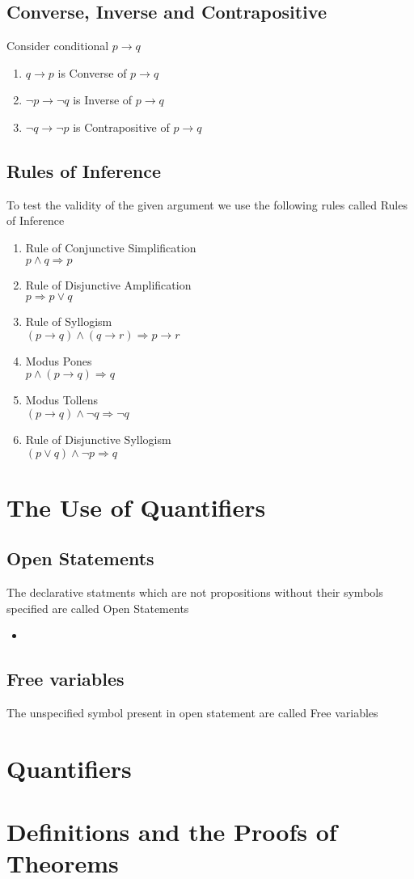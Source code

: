 \documentclass{article}
\begin{document}
	\subsection{Converse, Inverse and Contrapositive}
	Consider conditional $p\to q$
	\begin{enumerate}[label=\roman*)]
		\item $q\to p$ is Converse of $p\to q$
		\item $\neg p\to \neg q$ is Inverse of $p\to q$
		\item $\neg q\to \neg p$ is Contrapositive of $p\to q$
	\end{enumerate}

	\subsection{Rules of Inference}
	To test the validity of the given argument we use the following rules called Rules of Inference

	\begin{enumerate}[label=\roman*)]
		\item Rule of Conjunctive Simplification \\ $p\land q\Rightarrow p$
		\item Rule of Disjunctive Amplification \\ $p\Rightarrow p\lor q$
		\item Rule of Syllogism \\ $(p\to q)\land(q\to r)\Rightarrow p\to r$
		\item Modus Pones \\ $p\land(p\to q)\Rightarrow q$
		\item Modus Tollens \\ $(p\to q)\land\neg q\Rightarrow \neg q$
		\item Rule of Disjunctive Syllogism \\ $(p\lor q)\land\neg p\Rightarrow q$
	\end{enumerate}

	\section{The Use of Quantifiers}
	\subsection{Open Statements}
	The declarative statments which are not propositions without their symbols specified are called Open
	Statements

	\begin{itemize}
		\item 
	\end{itemize}

	\subsection{Free variables}
	The unspecified symbol present in open statement are called Free variables

	\section{Quantifiers}
	\section{Definitions and the Proofs of Theorems}
\end{document}

